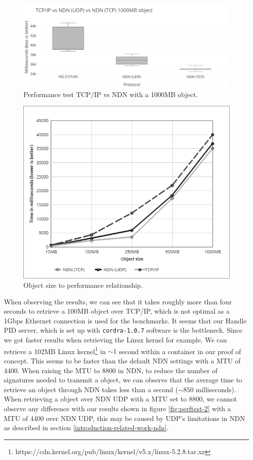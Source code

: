 \begin{figure}[H]
\centering
\includegraphics[scale=0.43]{Images/ndn_tcpip_1000_grey.png}
\caption{Performance test TCP/IP vs NDN with a 1000MB object.}
\label{fig:perftest-5}
\end{figure}

\begin{figure}[H]
\centering
\includegraphics[scale=0.7]{Images/linechart5.png}
\caption{Object size to performance relationship.}
\label{fig:perftest-6}
\end{figure}

When observing the results, we can see that it takes roughly more than four seconds to retrieve a 100MB object over TCP/IP, which is not optimal as a 1Gbps Ethernet connection is used for the benchmarks. 
It seems that our Handle PID server, which is set up with \texttt{cordra-1.0.7} software is the bottleneck. Since we got faster results when retrieving the Linux kernel for example. We can retrieve a 102MB Linux kernel\footnote{https://cdn.kernel.org/pub/linux/kernel/v5.x/linux-5.2.8.tar.xz} in ${\sim}1$ second within a container in our proof of concept. This seems to be faster than the default NDN settings with a MTU of 4400. When raising the MTU to 8800 in NDN, to reduce the number of signatures needed to transmit a object, we can observe that the average time to retrieve an object through NDN takes less than a second (${\sim}850$ milliseconds). 
When retrieving a object over NDN UDP with a MTU set to 8800, we cannot observe any difference with our results shown in figure \ref{fig:perftest-2} with a MTU of 4400 over NDN UDP, this may be caused by UDP's limitations in NDN as described in section \ref{introduction-related-work-ndn}.


